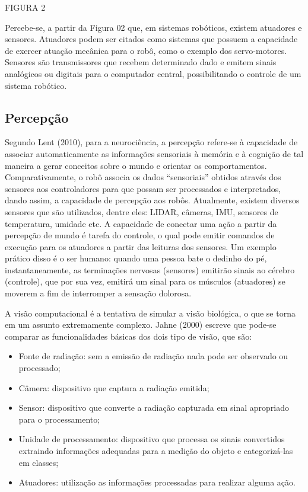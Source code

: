 FIGURA 2

Percebe-se, a partir da Figura 02 que, em sistemas robóticos, existem atuadores e sensores. Atuadores podem ser citados como sistemas que possuem a capacidade de exercer atuação mecânica para o robô, como o exemplo dos servo-motores. Sensores são transmissores que recebem determinado dado e emitem sinais analógicos ou digitais para o computador central, possibilitando o controle de um sistema robótico. 





\subsection{Percepção}\label{sec:perception}
Segundo Lent (2010), para a neurociência, a percepção refere-se à capacidade de associar automaticamente as informações sensoriais à memória e à cognição de tal maneira a gerar conceitos sobre o mundo e orientar os comportamentos. Comparativamente, o robô associa os dados “sensoriais” obtidos através dos sensores aos controladores para que possam ser processados e interpretados, dando assim, a capacidade de percepção aos robôs. 
Atualmente, existem diversos sensores que são utilizados, dentre eles: LIDAR, câmeras, IMU, sensores de temperatura, umidade etc. A capacidade de conectar uma ação a partir da percepção de mundo é tarefa do controle, o qual pode emitir comandos de execução para os atuadores a partir das leituras dos sensores. Um exemplo prático disso é o ser humano: quando uma pessoa bate o dedinho do pé, instantaneamente, as terminações nervosas (sensores) emitirão sinais ao cérebro (controle), que por sua vez, emitirá um sinal para os músculos (atuadores) se moverem a fim de interromper a sensação dolorosa.    

A visão computacional é a tentativa de simular a visão biológica, o que se torna em um assunto extremamente complexo. Jahne (2000) escreve que pode-se comparar as funcionalidades básicas dos dois tipo de visão, que são:

\begin{itemize}
	\item Fonte de radiação: sem a emissão de radiação nada pode ser observado ou processado;
	
	\item Câmera: dispositivo que captura a radiação emitida;
	
	\item Sensor: dispositivo que converte a radiação capturada em sinal apropriado para o processamento;
	
    \item Unidade de processamento: dispositivo que processa os sinais convertidos extraindo informações adequadas para a medição do objeto e categorizá-las em classes;
    \item Atuadores: utilização as informações processadas para realizar alguma ação.
    
\end{itemize}

